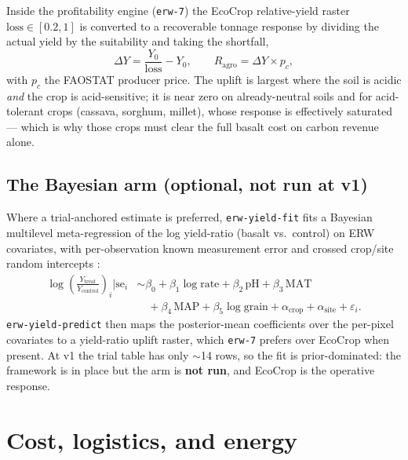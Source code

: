 \documentclass[openany]{book}
\begin{document}
Inside the profitability engine (\texttt{erw-7}) the EcoCrop relative-yield
raster $\text{loss}\in[0.2,1]$ is converted to a recoverable tonnage response by
dividing the actual yield by the suitability and taking the shortfall,
%
\begin{equation}
\Delta Y = \frac{Y_0}{\text{loss}} - Y_0,
\qquad R_{\mathrm{agro}} = \Delta Y \times p_c,
\label{eq:agro}
\end{equation}
%
with $p_c$ the FAOSTAT producer price. The uplift is largest where the soil is
acidic \emph{and} the crop is acid-sensitive; it is near zero on already-neutral
soils and for acid-tolerant crops (cassava, sorghum, millet), whose response is
effectively saturated --- which is why those crops must clear the full basalt
cost on carbon revenue alone.

\section{The Bayesian arm (optional, not run at v1)}

Where a trial-anchored estimate is preferred, \texttt{erw-yield-fit} fits a
Bayesian multilevel meta-regression of the log yield-ratio (basalt vs.\ control)
on ERW covariates, with per-observation known measurement error and crossed
crop/site random intercepts \citep{burkner2017}:
%
\begin{equation}
\begin{split}
\log\!\left(\frac{Y_{\text{treat}}}{Y_{\text{control}}}\right)_i \Big| \mathrm{se}_i
&\sim \beta_0 + \beta_1\log \text{rate} + \beta_2\,\mathrm{pH}
+ \beta_3\,\mathrm{MAT} \\
&\quad + \beta_4\,\mathrm{MAP} + \beta_5\log \text{grain}
+ \alpha_{\text{crop}} + \alpha_{\text{site}} + \varepsilon_i.
\end{split}
\label{eq:bayes}
\end{equation}
%
\texttt{erw-yield-predict} then maps the posterior-mean coefficients over the
per-pixel covariates to a yield-ratio uplift raster, which \texttt{erw-7}
prefers over EcoCrop when present. At v1 the trial table has only $\sim$14 rows,
so the fit is prior-dominated: the framework is in place but the arm is
\textbf{not run}, and EcoCrop is the operative response.

\chapter{Cost, logistics, and energy}\label{ch:cost}
\end{document}
